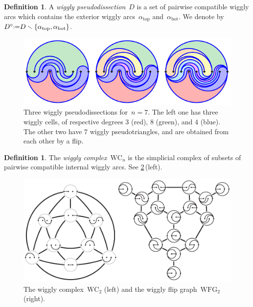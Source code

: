 \documentclass[submission]{FPSAC2025}
\theoremstyle{definition}
\newtheorem{definition}[theorem]{Definition}
\newcommand{\ssm}{\smallsetminus} %
\newcommand{\eqdef}{\mbox{\,\raisebox{0.2ex}{\scriptsize\ensuremath{\mathrm:}}\ensuremath{=}\,}} %
\newcommand{\darkblue}{\color{darkblue}} %
\newcommand{\defn}[1]{\textsl{\darkblue #1}} %
\newcommand{\wigglyComplex}{\mathrm{WC}} %
\newcommand{\wigglyFlipGraph}{\mathrm{WFG}} %
\begin{document}
\begin{definition}
A \defn{wiggly pseudodissection}~$D$ is a set of pairwise compatible wiggly arcs which contains the exterior wiggly arcs~$\alpha_\mathrm{top}$ and~$\alpha_\mathrm{bot}$. We denote by~$D^\circ \!\eqdef\! D \ssm \{\alpha_\mathrm{top}, \alpha_\mathrm{bot}\}$.

\begin{figure}[b]
\centerline{\includegraphics[scale=1.4]{wigglyPseudodissections}}
\caption{Three wiggly pseudodissections for~$n = 7$. The left one has three wiggly cells, of respective degrees $3$ (red), $8$ (green), and $4$ (blue). The other two have $7$ wiggly pseudotriangles, and are obtained from each other by a flip.}
\label{fig:pseudodissections}
\end{figure}
\end{definition}

\begin{definition}
\label{def:wigglyComplex}
The \defn{wiggly complex}~$\wigglyComplex_n$ is the simplicial complex of subsets of pairwise compatible internal wiggly arcs.
See \cref{fig:wigglyComplex}\,(left).

\begin{figure}
\centerline{\includegraphics[scale=1.1]{wigglyComplex}}
\caption{The wiggly complex~$\wigglyComplex_2$ (left) and the wiggly flip graph~$\wigglyFlipGraph_2$ (right).}
\label{fig:wigglyComplex}
\end{figure}
\end{definition}
\end{document}
